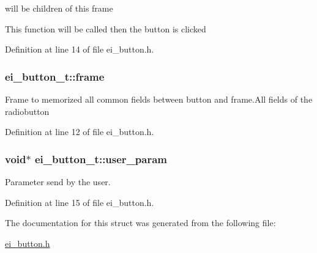 will be children of this frame 

This function will be called then the button is clicked 

Definition at line 14 of file ei\+\_\+button.\+h.

\hypertarget{structei__button__t_ae72bf3615425f3565c74f0883646d8b9}{
\subsubsection[{frame}]{ ei\+\_\+button\+\_\+t\+::frame}}\label{structei__button__t_ae72bf3615425f3565c74f0883646d8b9}
Frame to memorized all common fields between button and frame.\+All fields of the radiobutton 

Definition at line 12 of file ei\+\_\+button.\+h.

\hypertarget{structei__button__t_a56591ce45c0b47abf6ce150d5beef366}{
\subsubsection[{user\+\_\+param}]{\setlength{\rightskip}{0pt plus 5cm}void$\ast$ ei\+\_\+button\+\_\+t\+::user\+\_\+param}}\label{structei__button__t_a56591ce45c0b47abf6ce150d5beef366}


Parameter send by the user. 



Definition at line 15 of file ei\+\_\+button.\+h.



The documentation for this struct was generated from the following file\+:\begin{DoxyCompactItemize}
\item 
\hyperlink{ei__button_8h}{ei\+\_\+button.\+h}\end{DoxyCompactItemize}
